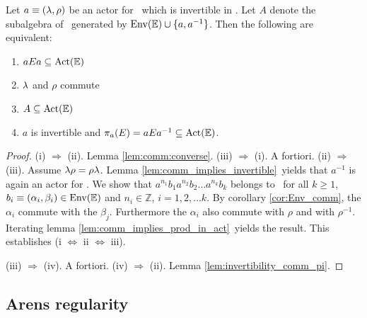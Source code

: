 \begin{lemma}  \label{lem:wu:commutation:invertibility}
  Let\/ $a\equiv(\lambda,\rho)$ be an actor for\/ \EE\ which is invertible in\/ \PreE\@.
  Let\/ $A$ denote the subalgebra of\/ \PreE\ generated by\/ $\mbox{\rm Env}(\mathbb{E}) \cup \{a, a^{-1}\}$.
  Then the following are equivalent:
  \begin{enumerate}
    \item $aEa \subseteq \mbox{\rm Act}(\mathbb{E})$
    \item $\lambda$ and $\rho$ commute
    \item $A \subseteq \mbox{\rm Act}(\mathbb{E})$
    \item $a$ is\/ \EEdash invertible and\/ $\pi_a(E) = aEa^{-1} \subseteq \mbox{\rm Act}(\mathbb{E})$.
  \end{enumerate}
\end{lemma}
\begin{proof}
  (i) $\Rightarrow$ (ii). Lemma \ref{lem:comm:converse}\@.
  (iii) $\Rightarrow$ (i). A fortiori.
  (ii) $\Rightarrow$ (iii).
  Assume $\lambda\rho=\rho\lambda$.
  Lemma \ref{lem:comm_implies_invertible}\ yields that
  $a^{-1}$ is again an actor for \EE\@.
  We show that $a^{n_1} b_1 a^{n_2} b_2  \ldots  a^{n_k} b_k$ belongs to \ActE\
  for all $k \geq 1$, $b_i\equiv (\alpha_i,\beta_i) \in \mbox{\rm Env}(\mathbb{E})$ and $n_i \in {\mathbb Z}$,
  $i=1,2,\ldots k$.
  By corollary \ref{cor:Env_comm}, the $\alpha_i$ commute with the $\beta_j$.
  Furthermore the $\alpha_i$ also commute with $\rho$ and with $\rho^{-1}\!$.
  Iterating lemma \ref{lem:comm_implies_prod_in_act}\ yields the result.
  This establishes (i $\Leftrightarrow$ ii $\Leftrightarrow$ iii).

  (iii) $\Rightarrow$ (iv). A fortiori.
  (iv)  $\Rightarrow$ (ii). Lemma \ref{lem:invertibility_comm_pi}.
\end{proof}



\subsection{Arens regularity}
\label{Arens regularity}

